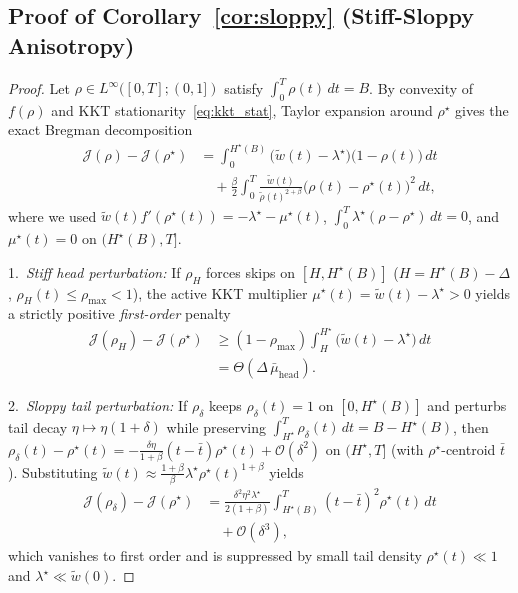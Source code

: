 \subsection{Proof of Corollary~\ref{cor:sloppy} (Stiff-Sloppy Anisotropy)}
\label{app:proof_cor1}

\begin{proof}
Let $\rho \in L^\infty([0, T]; (0, 1])$ satisfy $\int_0^T \rho(t)\,dt = B$. By convexity of $f(\rho)$ and KKT stationarity~\eqref{eq:kkt_stat}, Taylor expansion around $\rho^\star$ gives the exact Bregman decomposition
\begin{equation}
\begin{aligned}
\mathcal{J}(\rho) - \mathcal{J}(\rho^\star) &= \int_0^{H^\star(B)} \bigl(\tilde{w}(t) - \lambda^\star\bigr)\bigl(1 - \rho(t)\bigr)\,dt \\
&\quad + \frac{\beta}{2}\int_0^T \frac{\tilde{w}(t)}{\tilde{\rho}(t)^{2+\beta}}\bigl(\rho(t) - \rho^\star(t)\bigr)^2\,dt,
\end{aligned}
\end{equation}
where we used $\tilde{w}(t) f'(\rho^\star(t)) = -\lambda^\star - \mu^\star(t)$, $\int_0^T \lambda^\star(\rho - \rho^\star)\,dt = 0$, and $\mu^\star(t) = 0$ on $(H^\star(B), T]$.

1.~\emph{Stiff head perturbation:} If $\rho_H$ forces skips on $[H, H^\star(B)]$ ($H = H^\star(B) - \Delta$, $\rho_H(t) \le \rho_{\max} < 1$), the active KKT multiplier $\mu^\star(t) = \tilde{w}(t) - \lambda^\star > 0$ yields a strictly positive \emph{first-order} penalty
\begin{equation}
\begin{aligned}
\mathcal{J}(\rho_H) - \mathcal{J}(\rho^\star) &\ge (1 - \rho_{\max})\int_H^{H^\star} \bigl(\tilde{w}(t) - \lambda^\star\bigr)\,dt \\
&= \Theta(\Delta\,\bar{\mu}_{\mathrm{head}}).
\end{aligned}
\end{equation}

2.~\emph{Sloppy tail perturbation:} If $\rho_\delta$ keeps $\rho_\delta(t) = 1$ on $[0, H^\star(B)]$ and perturbs tail decay $\eta \mapsto \eta(1+\delta)$ while preserving $\int_{H^\star}^T \rho_\delta(t)\,dt = B - H^\star(B)$, then $\rho_\delta(t) - \rho^\star(t) = -\frac{\delta \eta}{1+\beta}(t - \bar{t})\rho^\star(t) + \mathcal{O}(\delta^2)$ on $(H^\star, T]$ (with $\rho^\star$-centroid $\bar{t}$). Substituting $\tilde{w}(t) \approx \frac{1+\beta}{\beta}\lambda^\star \rho^\star(t)^{1+\beta}$ yields
\begin{equation}
\begin{aligned}
\mathcal{J}(\rho_\delta) - \mathcal{J}(\rho^\star) &= \frac{\delta^2 \eta^2 \lambda^\star}{2(1+\beta)}\int_{H^\star(B)}^T (t - \bar{t})^2 \rho^\star(t)\,dt \\
&\quad + \mathcal{O}(\delta^3),
\end{aligned}
\end{equation}
which vanishes to first order and is suppressed by small tail density $\rho^\star(t) \ll 1$ and $\lambda^\star \ll \tilde{w}(0)$.
\end{proof}

